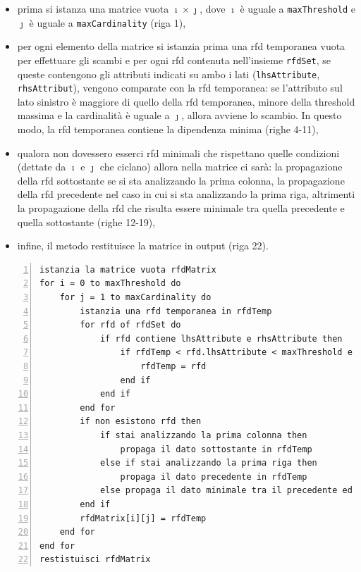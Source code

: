 \begin{itemize}
    \item prima si istanza una matrice vuota $\imath \times \jmath$, dove $\imath$ \`{e} uguale a \texttt{maxThreshold} e $\jmath$ \`{e} uguale a \texttt{maxCardinality} (riga 1),
    \item per ogni elemento della matrice si istanzia prima una \acrshort{rfd} temporanea vuota per effettuare gli scambi e per ogni \acrshort{rfd} contenuta nell'insieme \texttt{rfdSet}, se queste contengono gli attributi indicati su ambo i lati (\texttt{lhsAttribute}, \texttt{rhsAttribut}), vengono comparate con la \acrshort{rfd} temporanea: se l'attributo sul lato sinistro \`{e} maggiore di quello della \acrshort{rfd} temporanea, minore della threshold massima e la cardinalit\`{a} \`{e} uguale a $\jmath$, allora avviene lo scambio. In questo modo, la \acrshort{rfd} temporanea contiene la dipendenza minima (righe 4-11),
    \item qualora non dovessero esserci \acrshort{rfd} minimali che rispettano quelle condizioni (dettate da $\imath$ e $\jmath$ che ciclano) allora nella matrice ci sar\`{a}: la propagazione della \acrshort{rfd} sottostante se si sta analizzando la prima colonna, la propagazione della \acrshort{rfd} precedente nel caso in cui si sta analizzando la prima riga, altrimenti la propagazione della \acrshort{rfd} che risulta essere minimale tra quella precedente e quella sottostante (righe 12-19),
    \item infine, il metodo restituisce la matrice in output (riga 22).
\end{itemize}
\begin{lstlisting}[numbers=left, xleftmargin=3em, captionpos=b, caption={Pseudocodice del metodo per la propagazione dei dati.}, label=retrieveData_pseudo, frame=lines, breaklines=true, morekeywords={if, then, else, end, to, do, for, of}]
istanzia la matrice vuota rfdMatrix
for i = 0 to maxThreshold do
    for j = 1 to maxCardinality do
        istanzia una rfd temporanea in rfdTemp
        for rfd of rfdSet do
            if rfd contiene lhsAttribute e rhsAttribute then
                if rfdTemp < rfd.lhsAttribute < maxThreshold e rfd.cardinality = j then
                    rfdTemp = rfd
                end if
            end if
        end for
        if non esistono rfd then
            if stai analizzando la prima colonna then
                propaga il dato sottostante in rfdTemp
            else if stai analizzando la prima riga then
                propaga il dato precedente in rfdTemp
            else propaga il dato minimale tra il precedente ed il sottostante in rfdTemp
        end if
        rfdMatrix[i][j] = rfdTemp
    end for
end for
restistuisci rfdMatrix
\end{lstlisting}\par
